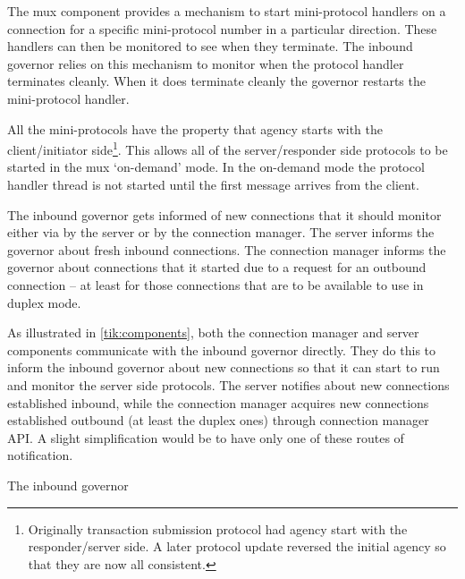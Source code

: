 The mux component provides a mechanism to start mini-protocol handlers on a
connection for a specific mini-protocol number in a particular direction. These
handlers can then be monitored to see when they terminate. The inbound governor
relies on this mechanism to monitor when the protocol handler terminates
cleanly. When it does terminate cleanly the governor restarts the mini-protocol
handler.

All the mini-protocols have the property that agency starts with the
client/initiator side\footnote{Originally transaction submission protocol had
agency start with the responder/server side. A later protocol update reversed
the initial agency so that they are now all consistent.}. This allows all of
the server/responder side protocols to be started in the mux `on-demand' mode.
In the on-demand mode the protocol handler thread is not started until the
first message arrives from the client. 

The inbound governor gets informed of new connections that it should monitor
either via by the server or by the connection manager. The server informs the
governor about fresh inbound connections. The connection manager informs the
governor about connections that it started due to a request for an outbound
connection -- at least for those connections that are to be available to use in
duplex mode.

As illustrated in \cref{tik:components}, both the connection manager and server
components communicate with the inbound governor directly. They do this to
inform the inbound governor about new connections so that it can start to run
and monitor the server side protocols. The server notifies about new connections
established inbound, while the connection manager acquires new connections
established outbound (at least the duplex ones) through connection manager API.
A slight simplification would be to have only one of these routes of
notification.

The inbound governor 

